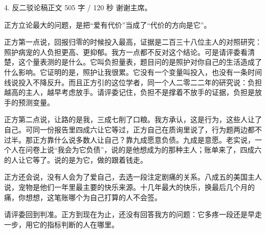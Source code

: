 \documentclass[script,con]{debate}
\begin{document}
\begin{speech}{4. 反二驳论稿}{正文 505 字 / 120 秒}
谢谢主席。

正方立论最大的问题，是把“爱有代价”当成了“代价的方向是它”。

正方第一点说，回报归零的时候投入最高，证据是二百三十八位主人的对照研究：照护病宠的人负担更高、更抑郁。我方一点都不反对这个结论。可是请评委看清楚，这个量表测的是什么。它叫负担量表，题目问的是照护对你自己的生活造成了什么影响。它证明的是，照护让我很累。它没有一个变量叫投入，也没有一条时间线说投入不降反升。而且正方引的这位学者，同一个人二零二二年的研究说：负担越高的主人，越早考虑放手。请评委记住，负担不是撑着不放手的证据，负担是放手的预测变量。

正方第二点说，让路的是我，三成七削了口粮。我方承认，这是行为，这些人让了自己。可同一份报告里四成六让它等过，正方自己在质询里说了，行为题两边都不过半。那正方靠什么说多数人让自己？靠九成愿意负债。九成是意愿。老实说，一个人在问卷上说“我会为它负债”，说的是他想成为的那种主人；账单来了，四成六的人让它等了。说的是为它，做的跟着钱走。

正方还会说，没有人会为了爱自己，去选一段注定剧痛的关系。八成五的美国主人说，宠物是他们一年里最主要的快乐来源。十几年最大的快乐，换最后几个月的痛，你想想，这笔账哪个为自己打算的人不会签。

请评委回到判准。正方到现在为止，还没有回答我方的问题：它多疼一段还是早走一步，用它的指标判断的人在哪里。
\end{speech}
\begin{contingency}
\end{contingency}
\end{document}
